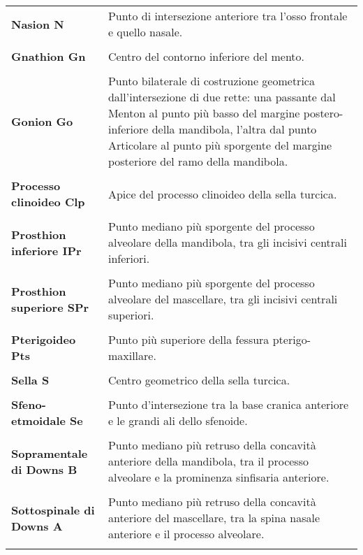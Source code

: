 \begin{longtable}{>{\bfseries}p{5cm}X}
Nasion \newline N & Punto di intersezione anteriore tra l'osso frontale e quello nasale.\\\\
Gnathion \newline Gn & Centro del contorno inferiore del mento.\\\\
Gonion \newline Go & Punto bilaterale di costruzione geometrica dall'intersezione di due rette: una passante dal Menton al punto più basso del margine postero-inferiore della mandibola, l'altra dal punto Articolare al punto più sporgente del margine posteriore del ramo della mandibola.\\\\
Processo clinoideo \newline Clp & Apice del processo clinoideo della sella turcica.\\\\
Prosthion inferiore \newline IPr & Punto mediano più sporgente del processo alveolare della mandibola, tra gli incisivi centrali inferiori.\\\\
Prosthion superiore \newline SPr & Punto mediano più sporgente del processo alveolare del mascellare, tra gli incisivi centrali superiori.\\\\
Pterigoideo \newline Pts & Punto più superiore della fessura pterigo-maxillare.\\\\
Sella \newline S & Centro geometrico della sella turcica.\\\\
Sfeno-etmoidale \newline Se & Punto d'intersezione tra la base cranica anteriore e le grandi ali dello sfenoide.\\\\
Sopramentale di Downs \newline B & Punto mediano più retruso della concavità anteriore della mandibola, tra il processo alveolare e la prominenza sinfisaria anteriore.\\\\
Sottospinale di Downs \newline A & Punto mediano più retruso della concavità anteriore del mascellare, tra la spina nasale anteriore e il processo alveolare.\\\\

\end{longtable}

